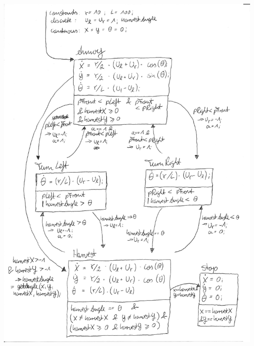 \documentclass[12pt]{article}
\begin{document}
\includegraphics[scale = 0.8]{pictures/hybrid_automata_collector}
\end{document}
